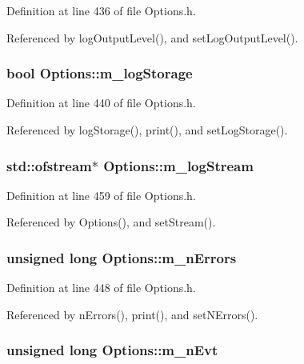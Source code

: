 Definition at line 436 of file Options.h.

Referenced by logOutputLevel(), and setLogOutputLevel().\hypertarget{classOptions_ab7ffad5110df714233470725ef98be6e}{
\subsubsection[{m\_\-logStorage}]{\setlength{\rightskip}{0pt plus 5cm}bool {\bf Options::m\_\-logStorage}}}
\label{classOptions_ab7ffad5110df714233470725ef98be6e}


Definition at line 440 of file Options.h.

Referenced by logStorage(), print(), and setLogStorage().\hypertarget{classOptions_a65c3a025880fb38373b599b87d600eef}{
\subsubsection[{m\_\-logStream}]{\setlength{\rightskip}{0pt plus 5cm}std::ofstream$\ast$ {\bf Options::m\_\-logStream}}}
\label{classOptions_a65c3a025880fb38373b599b87d600eef}


Definition at line 459 of file Options.h.

Referenced by Options(), and setStream().\hypertarget{classOptions_ae6460776ac3433103d88729a6811fc56}{
\subsubsection[{m\_\-nErrors}]{\setlength{\rightskip}{0pt plus 5cm}unsigned long {\bf Options::m\_\-nErrors}}}
\label{classOptions_ae6460776ac3433103d88729a6811fc56}


Definition at line 448 of file Options.h.

Referenced by nErrors(), print(), and setNErrors().\hypertarget{classOptions_a5e3bb1f2dfc4bf10cab08a33253cc4db}{
\subsubsection[{m\_\-nEvt}]{\setlength{\rightskip}{0pt plus 5cm}unsigned long {\bf Options::m\_\-nEvt}}}
\label{classOptions_a5e3bb1f2dfc4bf10cab08a33253cc4db}


